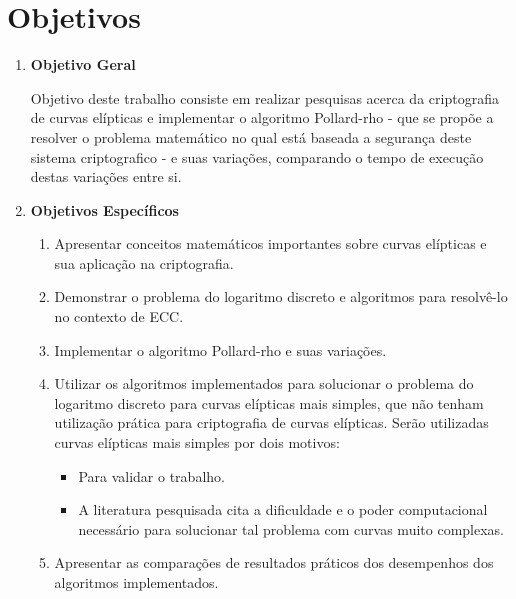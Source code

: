 \section*{Objetivos}
\begin{enumerate}
	\item \textbf{Objetivo Geral}

Objetivo deste trabalho consiste em realizar pesquisas acerca da criptografia de curvas elípticas e implementar o algoritmo Pollard-rho - que se propõe a resolver o problema matemático no qual está baseada a segurança deste sistema criptografico - e suas variações, comparando o tempo de execução destas variações entre si.

	\item \textbf{Objetivos Específicos}
	\begin{enumerate}
		\item Apresentar conceitos matemáticos importantes sobre curvas elípticas e sua aplicação na criptografia.
		\item Demonstrar o problema do logaritmo discreto e algoritmos para resolvê-lo no contexto de ECC.
		\item Implementar o algoritmo Pollard-rho e suas variações.
		\item Utilizar os algoritmos implementados para solucionar o problema do logaritmo discreto para curvas elípticas mais simples, que não tenham utilização prática para criptografia de curvas elípticas. Serão utilizadas curvas elípticas mais simples por dois motivos:
		\begin{itemize}
			\item Para validar o trabalho.
			\item A literatura pesquisada cita a dificuldade e o poder computacional necessário para solucionar tal problema com curvas muito complexas.
		\end{itemize}
		\item Apresentar as comparações de resultados práticos dos desempenhos dos algoritmos implementados.
	\end{enumerate}
\end{enumerate}
